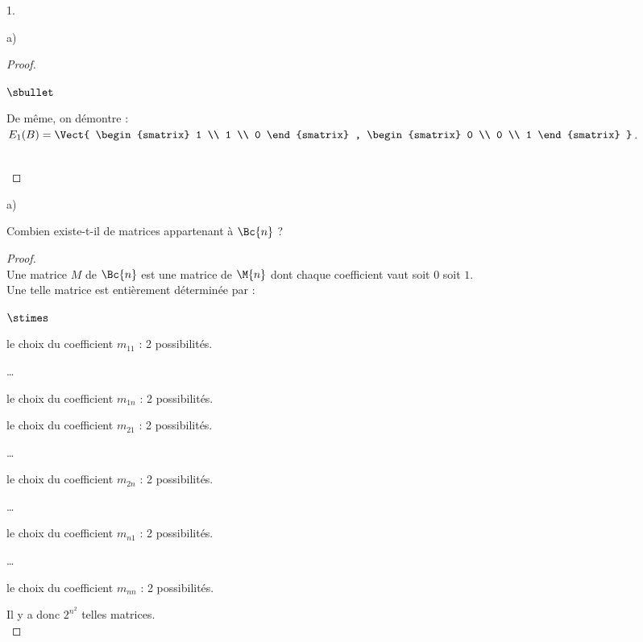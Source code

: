 \documentclass[11pt]{article}%
\begin{document}
\begin{noliste}{1.}
\begin{noliste}{a)}
\begin{proof}
\begin{remark}
\begin{noliste}{$\sbullet$}
          \item De même, on démontre : $E_{1}(B) =
            \Vect{ \begin{smatrix}
                1 \\
                1 \\
                0
              \end{smatrix}
              , 
              \begin{smatrix}
                0 \\
                0 \\
                1
              \end{smatrix}
            }$.
          \end{noliste}
        \end{remark}~\\[-1.4cm]
      \end{proof}
    \end{noliste}


\newpage


\item 
  \begin{noliste}{a)}
    \setlength{\itemsep}{2mm}
  \item Combien existe-t-il de matrices appartenant à $\Bc{n}$ ?
	
    \begin{proof}~\\%
      Une matrice $M$ de $\Bc{n}$ est une matrice de $\M{n}$ dont
      chaque coefficient vaut soit $0$ soit $1$.\\
      Une telle matrice est entièrement déterminée par :
      \begin{noliste}{$\stimes$}
      \item le choix du coefficient $m_{11}$ : 2 possibilités.
      \item \ldots
      \item le choix du coefficient $m_{1n}$ : 2 possibilités.
      \item le choix du coefficient $m_{21}$ : 2 possibilités.
      \item \ldots
      \item le choix du coefficient $m_{2n}$ : 2 possibilités.
      \item \ldots
      \item le choix du coefficient $m_{n1}$ : 2 possibilités.
      \item \ldots
      \item le choix du coefficient $m_{nn}$ : 2 possibilités.
      \end{noliste}
      Il y a donc $2^{n^2}$ telles matrices.%
      ~\\[-1cm]
    \end{proof}
    

\end{noliste}
\end{noliste}
\end{document}
